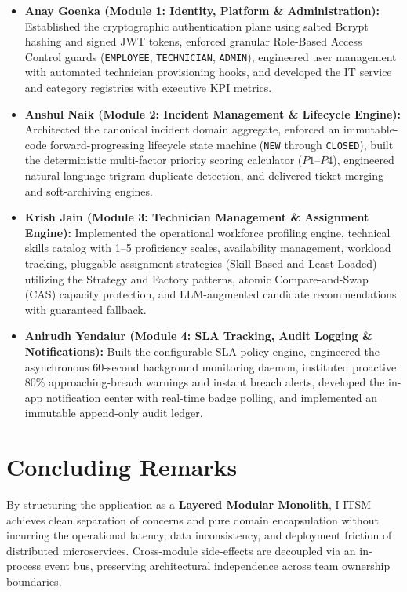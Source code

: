 \documentclass[11pt,a4paper,oneside]{report}
\begin{document}
\begin{itemize}
    \item \textbf{Anay Goenka (Module 1: Identity, Platform \& Administration):} Established the cryptographic authentication plane using salted Bcrypt hashing and signed JWT tokens, enforced granular Role-Based Access Control guards (\texttt{EMPLOYEE}, \texttt{TECHNICIAN}, \texttt{ADMIN}), engineered user management with automated technician provisioning hooks, and developed the IT service and category registries with executive KPI metrics.
    \item \textbf{Anshul Naik (Module 2: Incident Management \& Lifecycle Engine):} Architected the canonical incident domain aggregate, enforced an immutable-code forward-progressing lifecycle state machine (\texttt{NEW} through \texttt{CLOSED}), built the deterministic multi-factor priority scoring calculator ($P1$--$P4$), engineered natural language trigram duplicate detection, and delivered ticket merging and soft-archiving engines.
    \item \textbf{Krish Jain (Module 3: Technician Management \& Assignment Engine):} Implemented the operational workforce profiling engine, technical skills catalog with 1--5 proficiency scales, availability management, workload tracking, pluggable assignment strategies (Skill-Based and Least-Loaded) utilizing the Strategy and Factory patterns, atomic Compare-and-Swap (CAS) capacity protection, and LLM-augmented candidate recommendations with guaranteed fallback.
    \item \textbf{Anirudh Yendalur (Module 4: SLA Tracking, Audit Logging \& Notifications):} Built the configurable SLA policy engine, engineered the asynchronous 60-second background monitoring daemon, instituted proactive 80\% approaching-breach warnings and instant breach alerts, developed the in-app notification center with real-time badge polling, and implemented an immutable append-only audit ledger.
\end{itemize}

\section{Concluding Remarks}
\label{sec:concl_remarks}
By structuring the application as a \textbf{Layered Modular Monolith}, I-ITSM achieves clean separation of concerns and pure domain encapsulation without incurring the operational latency, data inconsistency, and deployment friction of distributed microservices. Cross-module side-effects are decoupled via an in-process event bus, preserving architectural independence across team ownership boundaries.
\end{document}
